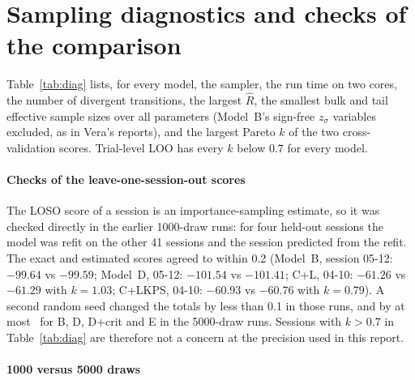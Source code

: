 \section{Sampling diagnostics and checks of the comparison}\label{app:diag}

Table~\ref{tab:diag} lists, for every model, the sampler, the run time on two cores, the number of divergent transitions, the largest $\hat R$, the smallest bulk and tail effective sample sizes over all parameters (Model~B's sign-free $z_\sigma$ variables excluded, as in Vera's reports), and the largest Pareto $k$ of the two cross-validation scores.
Trial-level LOO has every $k$ below 0.7 for every model.

\begin{table}[h]
\centering\small
\caption{Sampling diagnostics (4 chains $\times$ 5000 draws after 1000 tuning steps).}\label{tab:diag}

\end{table}

\paragraph{Checks of the leave-one-session-out scores}
The LOSO score of a session is an importance-sampling estimate, so it was checked directly in the earlier 1000-draw runs: for four held-out sessions the model was refit on the other 41 sessions and the session predicted from the refit.
The exact and estimated scores agreed to within 0.2 (Model~B, session 05-12: $-99.64$ vs $-99.59$; Model~D, 05-12: $-101.54$ vs $-101.41$; C+L, 04-10: $-61.26$ vs $-61.29$ with $k=1.03$; C+LKPS, 04-10: $-60.93$ vs $-60.76$ with $k=0.79$).
A second random seed changed the totals by less than 0.1 in those runs, and by at most \losoSeedMax\ for B, D, D+crit and E in the 5000-draw runs.
Sessions with $k>0.7$ in Table~\ref{tab:diag} are therefore not a concern at the precision used in this report.

\paragraph{1000 versus 5000 draws}

